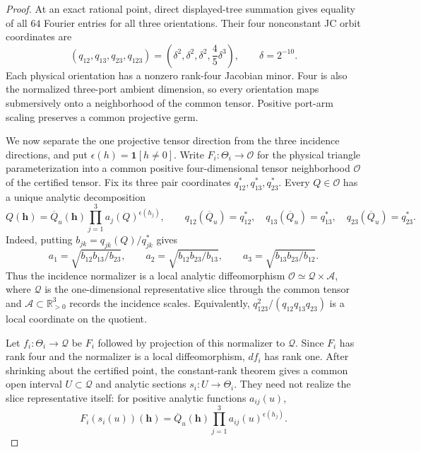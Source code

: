 \documentclass[11pt]{article}
\theoremstyle{remark}
\begin{document}
\begin{proof}
At an exact rational point, direct displayed-tree summation gives equality of
all $64$ Fourier entries for all three orientations.  Their four nonconstant
JC orbit coordinates are
\[
(q_{12},q_{13},q_{23},q_{123})
=\left(\delta^2,\delta^2,\delta^2,\frac45\delta^3\right),
\qquad \delta=2^{-10}.
\]
Each physical orientation has a nonzero rank-four Jacobian minor.  Four is
also the normalized three-port ambient dimension, so every orientation maps
submersively onto a neighborhood of the common tensor.  Positive port-arm
scaling preserves a common projective germ.

We now separate the one projective tensor direction from the three incidence
directions, and put $\epsilon(h)=\mathbf1[h\ne0]$.  Write
$F_i:\Theta_i\to\mathcal O$ for the physical triangle
parameterization into a common positive four-dimensional tensor neighborhood
$\mathcal O$ of the certified tensor.  Fix its three pair coordinates
$q_{12}^*,q_{13}^*,q_{23}^*$.  Every $Q\in\mathcal O$ has a unique analytic
decomposition
\[
 Q(\mathbf h)=\overline Q_u(\mathbf h)
       \prod_{j=1}^3a_j(Q)^{\epsilon(h_j)},
 \qquad
 q_{12}(\overline Q_u)=q_{12}^*,\quad
 q_{13}(\overline Q_u)=q_{13}^*,\quad
 q_{23}(\overline Q_u)=q_{23}^*.
\]
Indeed, putting $b_{jk}=q_{jk}(Q)/q_{jk}^*$ gives
\[
 a_1=\sqrt{b_{12}b_{13}/b_{23}},\qquad
 a_2=\sqrt{b_{12}b_{23}/b_{13}},\qquad
 a_3=\sqrt{b_{13}b_{23}/b_{12}}.
\]
Thus the incidence normalizer is a local analytic diffeomorphism
$\mathcal O\simeq\mathcal Q\times\mathcal A$, where $\mathcal Q$ is the
one-dimensional representative slice through the common tensor and
$\mathcal A\subset\mathbb R_{>0}^3$ records the incidence scales.  Equivalently,
$q_{123}^2/(q_{12}q_{13}q_{23})$ is a local coordinate on the quotient.

Let $f_i:\Theta_i\to\mathcal Q$ be $F_i$ followed by projection of this
normalizer to $\mathcal Q$.  Since $F_i$ has rank four and the normalizer is a
local diffeomorphism, $df_i$ has rank one.  After shrinking about the certified
point, the constant-rank theorem gives a common open interval
$U\subset\mathcal Q$ and analytic sections $s_i:U\to\Theta_i$.  They need not
realize the slice representative itself: for positive analytic functions
$a_{ij}(u)$,
\[
 F_i(s_i(u))(\mathbf h)=\overline Q_u(\mathbf h)
       \prod_{j=1}^3a_{ij}(u)^{\epsilon(h_j)}.
\]


\end{proof}
\end{document}
